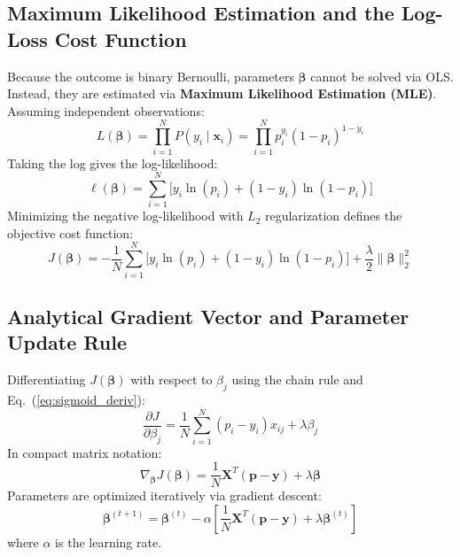 \documentclass[11pt,a4paper]{article}
\begin{document}
\subsection{Maximum Likelihood Estimation and the Log-Loss Cost Function}
Because the outcome is binary Bernoulli, parameters $\boldsymbol{\beta}$ cannot be solved via OLS. Instead, they are estimated via \textbf{Maximum Likelihood Estimation (MLE)}. Assuming independent observations:
\begin{equation}
    L(\boldsymbol{\beta}) = \prod_{i=1}^N P(y_i \mid \mathbf{x}_i) = \prod_{i=1}^N p_i^{y_i} (1 - p_i)^{1 - y_i}
\end{equation}
Taking the log gives the log-likelihood:
\begin{equation}
    \ell(\boldsymbol{\beta}) = \sum_{i=1}^N \Big[ y_i \ln(p_i) + (1 - y_i) \ln(1 - p_i) \Big]
\end{equation}
Minimizing the negative log-likelihood with $L_2$ regularization defines the objective cost function:
\begin{equation}
    J(\boldsymbol{\beta}) = -\frac{1}{N} \sum_{i=1}^N \Big[ y_i \ln(p_i) + (1 - y_i) \ln(1 - p_i) \Big] + \frac{\lambda}{2} \|\boldsymbol{\beta}\|_2^2
\end{equation}

\subsection{Analytical Gradient Vector and Parameter Update Rule}
Differentiating $J(\boldsymbol{\beta})$ with respect to $\beta_j$ using the chain rule and Eq.~(\ref{eq:sigmoid_deriv}):
\begin{equation}
    \frac{\partial J}{\partial \beta_j} = \frac{1}{N} \sum_{i=1}^N (p_i - y_i) x_{ij} + \lambda \beta_j
\end{equation}
In compact matrix notation:
\begin{equation}
    \nabla_{\boldsymbol{\beta}} J(\boldsymbol{\beta}) = \frac{1}{N} \mathbf{X}^T (\mathbf{p} - \mathbf{y}) + \lambda \boldsymbol{\beta}
\end{equation}
Parameters are optimized iteratively via gradient descent:
\begin{equation}
    \boldsymbol{\beta}^{(t+1)} = \boldsymbol{\beta}^{(t)} - \alpha \left[ \frac{1}{N} \mathbf{X}^T (\mathbf{p} - \mathbf{y}) + \lambda \boldsymbol{\beta}^{(t)} \right]
\end{equation}
where $\alpha$ is the learning rate.

\end{document}
